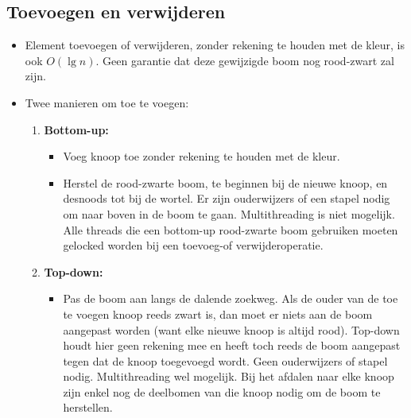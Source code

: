 \subsection{Toevoegen en verwijderen}
\begin{itemize}
    \item Element toevoegen of verwijderen, zonder rekening te houden met de kleur, is ook $O(\lg n)$.
    \alert Geen garantie dat deze gewijzigde boom nog rood-zwart zal zijn.
    \item Twee manieren om toe te voegen:
    \begin{enumerate}
        \item \textbf{Bottom-up:} 
        \begin{itemize}
            \item Voeg knoop toe zonder rekening te houden met de kleur.
            \item Herstel de rood-zwarte boom, te beginnen bij de nieuwe knoop, en desnoods tot bij de wortel.
            \alert Er zijn ouderwijzers of een stapel nodig om naar boven in de boom te gaan.
            \alert Multithreading is niet mogelijk. Alle threads die een bottom-up rood-zwarte boom gebruiken moeten gelocked worden bij een toevoeg-of verwijderoperatie.
        \end{itemize}
        \item \textbf{Top-down:} 
        \begin{itemize}
            \item Pas de boom aan langs de dalende zoekweg.
            \alert Als de ouder van de toe te voegen knoop reeds zwart is, dan moet er niets aan de boom aangepast worden (want elke nieuwe knoop is altijd rood). Top-down houdt hier geen rekening mee en heeft toch reeds de boom aangepast tegen dat de knoop toegevoegd wordt.
            \good Geen ouderwijzers of stapel nodig.
            \good Multithreading wel mogelijk. Bij het afdalen naar elke knoop zijn enkel nog de deelbomen van die knoop nodig om de boom te herstellen.
        \end{itemize}
    \end{enumerate}
\end{itemize}

